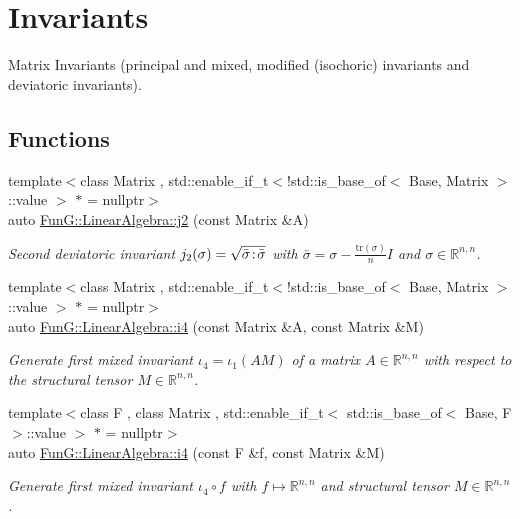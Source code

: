 \hypertarget{group__InvariantGroup}{}\section{Invariants}
\label{group__InvariantGroup}


Matrix Invariants (principal and mixed, modified (isochoric) invariants and deviatoric invariants).  


\subsection*{Functions}
\begin{DoxyCompactItemize}
\item 
{\footnotesize template$<$class Matrix , std\+::enable\+\_\+if\+\_\+t$<$!std\+::is\+\_\+base\+\_\+of$<$ Base, Matrix $>$\+::value $>$ $\ast$  = nullptr$>$ }\\auto \hyperlink{group__InvariantGroup_ga9a2bc859fe1ae34b1a3ada91a39d69df}{Fun\+G\+::\+Linear\+Algebra\+::j2} (const Matrix \&A)
\begin{DoxyCompactList}\small\item\em Second deviatoric invariant $ j_2(\sigma)=\sqrt{\bar\sigma\negthinspace:\negthinspace\bar\sigma} $ with $\bar\sigma = \sigma - \frac{\mathrm{tr}(\sigma)}{n}I$ and $\sigma\in\mathbb{R}^{n,n}$. \end{DoxyCompactList}\item 
{\footnotesize template$<$class Matrix , std\+::enable\+\_\+if\+\_\+t$<$!std\+::is\+\_\+base\+\_\+of$<$ Base, Matrix $>$\+::value $>$ $\ast$  = nullptr$>$ }\\auto \hyperlink{group__InvariantGroup_ga1898785172ecce11af0c27e54d555009}{Fun\+G\+::\+Linear\+Algebra\+::i4} (const Matrix \&A, const Matrix \&M)
\begin{DoxyCompactList}\small\item\em Generate first mixed invariant $ \iota_4=\iota_1(AM) $ of a matrix $A\in\mathbb{R}^{n,n}$ with respect to the structural tensor $M\in\mathbb{R}^{n,n}$. \end{DoxyCompactList}\item 
{\footnotesize template$<$class F , class Matrix , std\+::enable\+\_\+if\+\_\+t$<$ std\+::is\+\_\+base\+\_\+of$<$ Base, F $>$\+::value $>$ $\ast$  = nullptr$>$ }\\auto \hyperlink{group__InvariantGroup_ga0df96cdb1e4b8b5a040f2adc97c51100}{Fun\+G\+::\+Linear\+Algebra\+::i4} (const F \&f, const Matrix \&M)
\begin{DoxyCompactList}\small\item\em Generate first mixed invariant $ \iota_4\circ f $ with $f\mapsto\mathbb{R}^{n,n}$ and structural tensor $M\in\mathbb{R}^{n,n}$. \end{DoxyCompactList}\item 

\end{DoxyCompactItemize}
